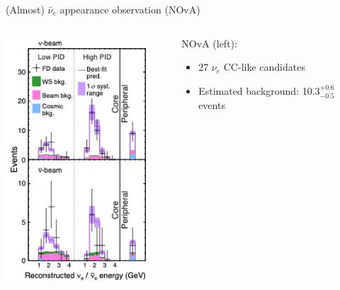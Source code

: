 \begin{frame}{(Almost) $\bar{\nu}_e$ appearance observation (NOvA)}

  \begin{columns}[T]
    \begin{column}{0.40\textwidth}
       \includegraphics[width=0.90\textwidth]{./images/3nu/accelerator/nova_nuebar_app2019.png}
    \end{column}
    \begin{column}{0.60\textwidth}
       NOvA (left):
       \begin{itemize}
         \item 27 $\nu_e$ CC-like candidates
         \item Estimated background: 10.3$^{+0.6}_{-0.5}$ events

\end{itemize}
\end{column}
\end{columns}
\end{frame}
